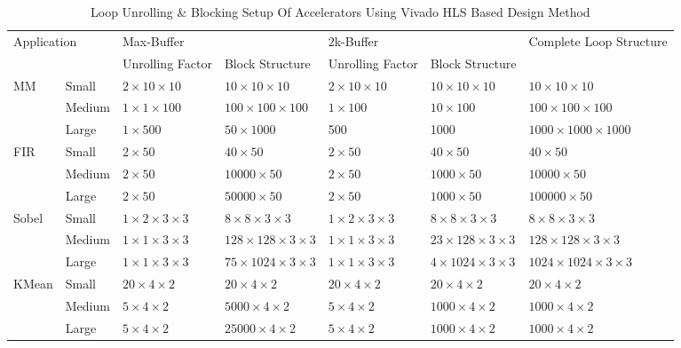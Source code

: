 \begin{table*}[t]
\centering
\caption{Loop Unrolling \& Blocking Setup Of Accelerators Using Vivado HLS Based Design Method}
\label{tab:loop-unrolling-setup-vivado}
\begin{tabular}{|l|l|l|l|l|l|l|}
\hline
\multicolumn{2}{|l|}{\multirow{2}{*}{Application}} & \multicolumn{2}{l|}{Max-Buffer} & \multicolumn{2}{l|}{2k-Buffer} & \multirow{2}{*}{Complete Loop Structure} \\ \cline{3-6}
\multicolumn{2}{|l|}{} & Unrolling Factor & Block Structure & Unrolling Factor & Block Structure & \\ \hline
\multirow{3}{*}{MM} & Small & $2 \times 10 \times 10$ & $10 \times 10 \times 10$ & $2 \times 10 \times 10$ & $10 \times 10 \times 10$ & $10 \times 10 \times 10$ \\ \cline{2-7} 
                    & Medium & $1 \times 1 \times 100$ & $100 \times 100 \times 100$ & $1 \times 100$ & $10 \times 100$ & $100 \times 100 \times 100$ \\ \cline{2-7} 
                    & Large & $1 \times 500$ & $50 \times 1000$ & 500 & 1000  & $1000 \times 1000 \times 1000$ \\ \hline
\multirow{3}{*}{FIR} & Small & $2 \times 50$ & $40 \times 50$ & $2 \times 50$ & $40 \times 50$ & $40 \times 50$ \\ \cline{2-7} 
                     & Medium & $2 \times 50$ & $10000 \times 50$ & $2 \times 50$ & $1000 \times 50$ & $10000 \times 50$ \\ \cline{2-7} 
                     & Large & $2 \times 50$ & $50000 \times 50$ & $2 \times 50$ & $1000 \times 50$ & $100000 \times 50$ \\ \hline
\multirow{3}{*}{Sobel} & Small & $1 \times 2 \times 3 \times 3$ & $8 \times 8 \times 3 \times 3$ & $1 \times 2 \times 3 \times 3$ & $8 \times 8 \times 3 \times 3$ & $8 \times 8 \times 3 \times 3$ \\ \cline{2-7} 
                       & Medium & $1 \times 1 \times 3 \times 3$ & $128 \times 128 \times 3 \times 3$ & $1 \times 1 \times 3 \times 3$ & $23 \times 128 \times 3 \times 3$ & $128 \times 128 \times 3 \times 3$ \\ \cline{2-7} 
                       & Large & $1 \times 1 \times 3 \times 3$ & $75 \times 1024 \times 3 \times 3$ & $1 \times 1 \times 3 \times 3$ & $4 \times 1024 \times 3 \times 3$ & $1024 \times 1024 \times 3 \times 3$ \\ \hline
\multirow{3}{*}{KMean} & Small & $20 \times 4 \times 2$ & $20 \times 4 \times 2$ & $20 \times 4 \times 2$ & $20 \times 4 \times 2$ & $20 \times 4 \times 2$ \\ \cline{2-7} 
                       & Medium & $5 \times 4 \times 2$ & $5000 \times 4 \times 2$ & $5 \times 4 \times 2$ & $1000 \times 4 \times 2$ & $1000 \times 4 \times 2$ \\ \cline{2-7} 
                       & Large & $5 \times 4 \times 2$ & $25000 \times 4 \times 2$ & $5 \times 4 \times 2$ & $1000 \times 4 \times 2$ & $1000 \times 4 \times 2$ \\ \hline
\end{tabular}
\end{table*}

